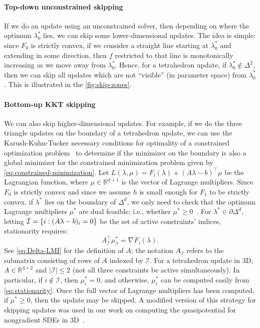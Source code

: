 \documentclass{article}
\begin{document}
\paragraph{Top-down unconstrained skipping} If we do an update using
an unconstrained solver, then depending on where the optimum
$\lambda_0^*$ lies, we can skip some lower-dimensional updates. The
idea is simple: since $F_0$ is strictly convex, if we consider a
straight line starting at $\lambda_0^*$ and extending in some
direction, then $f$ restricted to that line is monotonically
increasing as we move away from $\lambda_0^*$. Hence, for a
tetrahedron update, if $\lambda_0^* \notin \Delta^2$, then we can skip
all updates which are not ``visible'' (in parameter space) from
$\lambda_0^*$. This is illustrated in the \cref{fig:skip-zones}.

\paragraph{Bottom-up KKT skipping} We can also skip higher-dimensional
updates. For example, if we do the three triangle updates on the
boundary of a tetrahedron update, we can use the Karush-Kuhn-Tucker
necessary conditions for optimality of a constrained optimization
problem~\cite{nocedal2006numerical} to determine if the minimizer on
the boundary is also a global minimizer for the constrained
minimization problem given by \cref{eq:constrained-minimization}. Let
$L(\lambda, \mu) = F_i(\lambda) + (A\lambda - b)^\top \mu$ be the
Lagrangian function, where $\mu \in \mathbb{R}^{d + 1}$ is the vector
of Lagrange multipliers. Since $F_0$ is strictly convex and since we
assume $h$ is small enough for $F_1$ to be strictly convex, if
$\lambda^*$ lies on the boundary of $\Delta^d$, we only need to check
that the optimum Lagrange multipliers $\mu^*$ are dual feasible; i.e.,
whether
$\mu^* \geq 0$~\cite{bertsekas1999nonlinear,nocedal2006numerical}. For
$\lambda^* \in \partial \Delta^d$, letting
$\mathcal{I} = \left\{i : (A\lambda - b)_i = 0\right\}$ be the set of active
constraints' indices, stationarity requires:
\begin{equation}\label{eq:stationarity}
  A^\top_{\mathcal{I}} \mu_{\mathcal{I}}^* = \nabla F_i(\lambda).
\end{equation}
See \cref{eq:Delta-LMI} for the definition of $A$; the notation
$A_{\mathcal{I}}$ refers to the submatrix consisting of rows of $A$
indexed by $\mathcal{I}$. For a tetrahedron update in 3D,
$A \in \mathbb{R}^{3 \times 2}$ and $|\mathcal{I}| \leq 2$ (not all
three constraints be active simultaneously). In particular, if
$i \notin \mathcal{I}$, then $\mu_i^* = 0$, and otherwise, $\mu_i^*$
can be computed easily from \cref{eq:stationarity}. Once the full
vector of Lagrange multipliers has been computed, if $\mu^* \geq 0$,
then the update may be skipped. A modified version of this strategy
for skipping updates was used in our work on computing the
quasipotential for nongradient SDEs in 3D~\cite{yang2019computing}.
\end{document}
